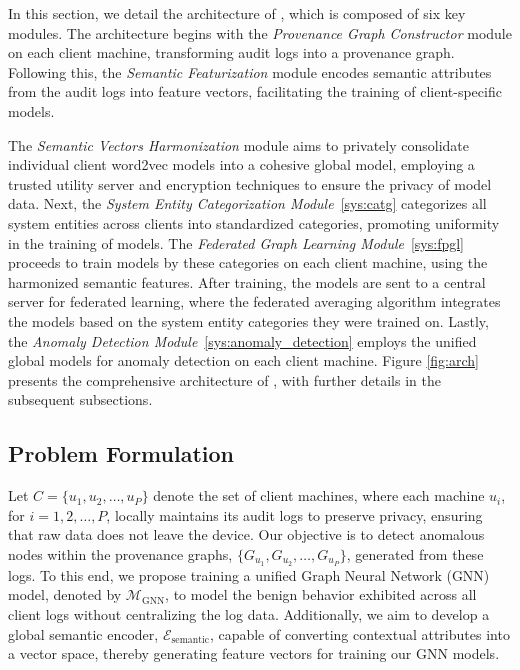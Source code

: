 In this section, we detail the architecture of \Sys, which is composed of six key modules. The architecture begins with the \textit{Provenance Graph Constructor} module on each client machine, transforming audit logs into a provenance graph. Following this, the \textit{Semantic Featurization} module encodes semantic attributes from the audit logs into feature vectors, facilitating the training of client-specific \gnnshort models.

The \textit{Semantic Vectors Harmonization} module aims to privately consolidate individual client word2vec models into a cohesive global model, employing a trusted utility server and encryption techniques to ensure the privacy of model data. Next, the \textit{System Entity Categorization Module}~\ref{sys:catg} categorizes all system entities across clients into standardized categories, promoting uniformity in the training of \gnnshort models. The \textit{Federated Graph Learning Module}~\ref{sys:fpgl} proceeds to train \gnnshort models by these categories on each client machine, using the harmonized semantic features. After training, the models are sent to a central server for federated learning, where the federated averaging algorithm integrates the models based on the system entity categories they were trained on. Lastly, the \textit{Anomaly Detection Module}~\ref{sys:anomaly_detection} employs the unified global models for anomaly detection on each client machine. Figure \ref{fig:arch} presents the comprehensive architecture of \Sys, with further details in the subsequent subsections.

\subsection{Problem Formulation}

Let \( C = \{u_1, u_2, \ldots, u_P\} \) denote the set of client machines, where each machine \( u_i \), for \( i = 1, 2, \ldots, P \), locally maintains its audit logs to preserve privacy, ensuring that raw data does not leave the device. Our objective is to detect anomalous nodes within the provenance graphs, \( \{G_{u_1}, G_{u_2}, \ldots, G_{u_P}\} \), generated from these logs. To this end, we propose training a unified Graph Neural Network (GNN) model, denoted by \( \mathcal{M}_{\text{GNN}} \), to model the benign behavior exhibited across all client logs without centralizing the log data. Additionally, we aim to develop a global semantic encoder, \( \mathcal{E}_{\text{semantic}} \), capable of converting contextual attributes into a vector space, thereby generating feature vectors for training our GNN models.

